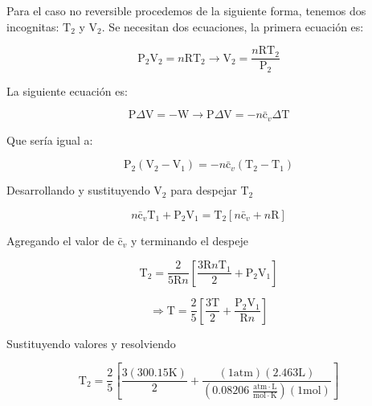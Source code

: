 \documentclass[12pt]{article}
\begin{document}
Para el caso no reversible procedemos de la siguiente forma, tenemos dos incognitas: $\mathrm{T}_2$ y $\mathrm{V}_2$. Se necesitan dos ecuaciones, la primera ecuación es:

\begin{displaymath}
	\mathrm{P}_2\mathrm{V}_2=n\mathrm{R}\mathrm{T}_2 \rightarrow \mathrm{V}_2=\frac{n\mathrm{R}\mathrm{T}_2}{\mathrm{P}_2}
\end{displaymath}

La siguiente ecuación es:

\begin{displaymath}
	\mathrm{P}\Delta\mathrm{V}=-\mathrm{W} \rightarrow 	\mathrm{P}\Delta\mathrm{V}= -n\mathrm{\bar{c}}_v\Delta\mathrm{T}
\end{displaymath}

Que sería igual a:

\begin{displaymath}
	\mathrm{P}_2(\mathrm{V}_2-\mathrm{V}_1)=-n\mathrm{\bar{c}}_v(\mathrm{T}_2-\mathrm{T}_1)
\end{displaymath}

Desarrollando y sustituyendo $\mathrm{V}_2$ para despejar $\mathrm{T}_2$

\begin{displaymath}
	n\mathrm{\bar{c}}_v\mathrm{T}_1+\mathrm{P}_2\mathrm{V}_1=\mathrm{T}_2\left[ n\mathrm{\bar{c}}_v+n\mathrm{R} \right]
\end{displaymath}

Agregando el valor de $\mathrm{\bar{c}}_v$ y terminando el despeje

\begin{displaymath}
	\mathrm{T}_2=\frac{2}{5\mathrm{R}n}\left[ \frac{3\mathrm{R}n\mathrm{T}_1}{2}+\mathrm{P}_2\mathrm{V}_1 \right]
\end{displaymath}

\begin{displaymath}
	\Rightarrow	\mathrm{T}=\frac{2}{5}\left[ \frac{3\mathrm{T}}{2}+\frac{\mathrm{P}_2\mathrm{V}_1}{\mathrm{R}n} \right]
\end{displaymath}

Sustituyendo valores y resolviendo

\begin{displaymath}
	\mathrm{T}_2=\frac{2}{5} \left[ \frac{3(300.15\mathrm{K})}{2}+\frac{(1\mathrm{atm})(2.463\mathrm{L})}{(0.08206\; \frac{\mathrm{atm}\cdot\mathrm{L}}{\mathrm{mol}\cdot\mathrm{K}})(1\mathrm{mol})} \right]
\end{displaymath}
\end{document}
